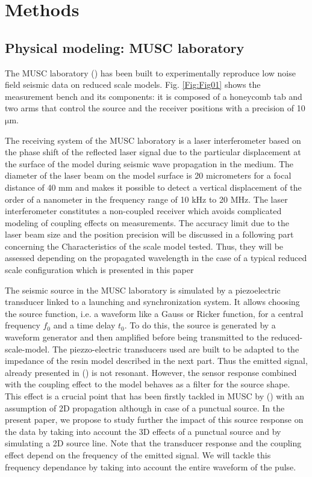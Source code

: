 \documentclass[extra,mreferee]{gji}
\begin{document}
\section{Methods}

 


\subsection{Physical modeling: MUSC laboratory}

The MUSC laboratory (\cite{Bretaudeau_SSA_2008b,bretaudeau2011ssm,bretaudeau2013fwi}) has been built to experimentally reproduce low noise field seismic data on reduced scale models. Fig. \ref{Fig:Fig01} shows the measurement bench and its components: it is composed of a honeycomb tab and two arms that control the source and the receiver positions with a precision of 10 $\mathrm{\mu m}$.

The receiving system of the MUSC laboratory is a laser interferometer based on the phase shift of the reflected laser signal due to the particular displacement at the surface of the model during seismic wave propagation in the medium. The diameter of the laser beam on the model surface is 20 micrometers for a focal distance of 40 mm and makes it possible to detect a vertical displacement of the order of a nanometer in the frequency range of 10 kHz to 20 MHz. The laser interferometer constitutes a non-coupled receiver which avoids complicated modeling of coupling effects on measurements.{\color{magenta} The accuracy limit due to the laser beam size and the position precision will be discussed in a following part concerning the Characteristics of the scale model tested. Thus, they will be assessed depending on the propagated wavelength in the case of a typical reduced scale configuration which is presented in this paper }

The seismic source in the MUSC laboratory is simulated by a piezoelectric transducer linked to a launching and synchronization system. It allows choosing the source function, i.e. a waveform like a Gauss or Ricker function, for a central frequency $f_{0}$ and a time delay $t_{0}$. To do this, the source is generated by a waveform generator and then amplified before being transmitted to the reduced-scale-model. {\color{magenta}The piezzo-electric transducers used are built to be adapted to the impedance of the resin model described in the next part. Thus the emitted signal, already presented in (\cite{bretaudeau2011ssm}) is not resonant. However, the sensor response combined with the coupling effect to the model behaves as a filter for the source shape. This effect is a crucial point that has been firstly tackled in MUSC by (\cite{bretaudeau2011ssm}) with an assumption of 2D propagation although in case of a punctual source. In the present paper, we propose to study further the impact of this source response on the data by taking into account the 3D effects of a punctual source and by simulating a 2D source line. Note that the transducer response and the coupling effect depend on the frequency of the emitted signal. We will tackle this frequency dependance by taking into account the entire waveform of the pulse.}
\end{document}
